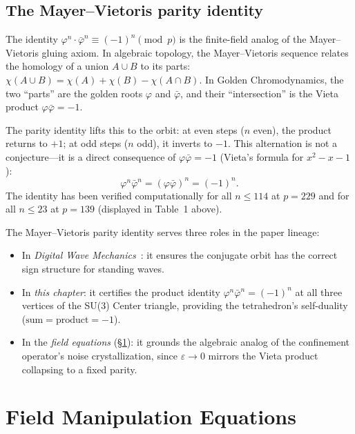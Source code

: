 \subsection{The Mayer--Vietoris parity identity}
\label{sec:mv_parity}

The identity $\varphi^n \cdot \bar\varphi^n \equiv (-1)^n \pmod{p}$
is the finite-field analog of the Mayer--Vietoris gluing axiom.
In algebraic topology, the Mayer--Vietoris sequence relates the
homology of a union $A \cup B$ to its parts:
$\chi(A \cup B) = \chi(A) + \chi(B) - \chi(A \cap B)$.
In Golden Chromodynamics, the two ``parts'' are the golden roots
$\varphi$ and $\bar\varphi$, and their ``intersection'' is the
Vieta product $\varphi \bar\varphi = -1$.

The parity identity lifts this to the orbit:
at even steps ($n$ even), the product returns to $+1$;
at odd steps ($n$ odd), it inverts to $-1$.
This alternation is not a conjecture---it is a direct consequence
of $\varphi \bar\varphi = -1$ (Vieta's formula for $x^2 - x - 1$):
\[
\varphi^n \bar\varphi^n = (\varphi \bar\varphi)^n = (-1)^n.
\]
The identity has been verified computationally for all $n \leq 114$
at $p = 229$ and for all $n \leq 23$ at $p = 139$
(displayed in Table~1 above).

The Mayer--Vietoris parity identity serves three roles in the
paper lineage:
\begin{itemize}
\item In \emph{Digital Wave Mechanics}~\cite{lockwood_larue_dwm, dwm}: it ensures the
  conjugate orbit has the correct sign structure for standing waves.
\item In \emph{this chapter}: it certifies the product identity
  $\varphi^n \bar\varphi^n = (-1)^n$ at all three vertices of the
  SU(3) Center triangle, providing the tetrahedron's
  self-duality ($\text{sum} = \text{product} = -1$).
\item In the \emph{field equations} (\S\ref{sec:field_equations}):
  it grounds the algebraic analog of the confinement operator's noise
  crystallization, since $\varepsilon \to 0$ mirrors the Vieta product
  collapsing to a fixed parity.
\end{itemize}

\section{Field Manipulation Equations}
\label{sec:field_equations}

